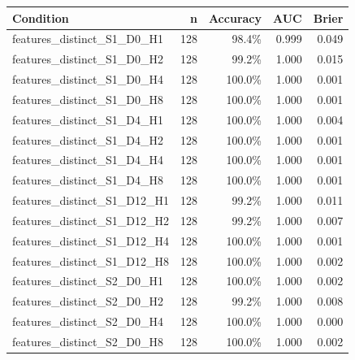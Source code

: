 \documentclass[11pt]{article}
\begin{document}
\small\begin{longtable}{p{}rrrr}\toprule Condition & n & Accuracy & AUC & Brier\\\midrule\endhead
features\_\allowbreak{}distinct\_\allowbreak{}S1\_\allowbreak{}D0\_\allowbreak{}H1 & 128 & 98.4\% & 0.999 & 0.049\\
features\_\allowbreak{}distinct\_\allowbreak{}S1\_\allowbreak{}D0\_\allowbreak{}H2 & 128 & 99.2\% & 1.000 & 0.015\\
features\_\allowbreak{}distinct\_\allowbreak{}S1\_\allowbreak{}D0\_\allowbreak{}H4 & 128 & 100.0\% & 1.000 & 0.001\\
features\_\allowbreak{}distinct\_\allowbreak{}S1\_\allowbreak{}D0\_\allowbreak{}H8 & 128 & 100.0\% & 1.000 & 0.001\\
features\_\allowbreak{}distinct\_\allowbreak{}S1\_\allowbreak{}D4\_\allowbreak{}H1 & 128 & 100.0\% & 1.000 & 0.004\\
features\_\allowbreak{}distinct\_\allowbreak{}S1\_\allowbreak{}D4\_\allowbreak{}H2 & 128 & 100.0\% & 1.000 & 0.001\\
features\_\allowbreak{}distinct\_\allowbreak{}S1\_\allowbreak{}D4\_\allowbreak{}H4 & 128 & 100.0\% & 1.000 & 0.001\\
features\_\allowbreak{}distinct\_\allowbreak{}S1\_\allowbreak{}D4\_\allowbreak{}H8 & 128 & 100.0\% & 1.000 & 0.001\\
features\_\allowbreak{}distinct\_\allowbreak{}S1\_\allowbreak{}D12\_\allowbreak{}H1 & 128 & 99.2\% & 1.000 & 0.011\\
features\_\allowbreak{}distinct\_\allowbreak{}S1\_\allowbreak{}D12\_\allowbreak{}H2 & 128 & 99.2\% & 1.000 & 0.007\\
features\_\allowbreak{}distinct\_\allowbreak{}S1\_\allowbreak{}D12\_\allowbreak{}H4 & 128 & 100.0\% & 1.000 & 0.001\\
features\_\allowbreak{}distinct\_\allowbreak{}S1\_\allowbreak{}D12\_\allowbreak{}H8 & 128 & 100.0\% & 1.000 & 0.002\\
features\_\allowbreak{}distinct\_\allowbreak{}S2\_\allowbreak{}D0\_\allowbreak{}H1 & 128 & 100.0\% & 1.000 & 0.002\\
features\_\allowbreak{}distinct\_\allowbreak{}S2\_\allowbreak{}D0\_\allowbreak{}H2 & 128 & 99.2\% & 1.000 & 0.008\\
features\_\allowbreak{}distinct\_\allowbreak{}S2\_\allowbreak{}D0\_\allowbreak{}H4 & 128 & 100.0\% & 1.000 & 0.000\\
features\_\allowbreak{}distinct\_\allowbreak{}S2\_\allowbreak{}D0\_\allowbreak{}H8 & 128 & 100.0\% & 1.000 & 0.002\\

\end{longtable}
\end{document}
